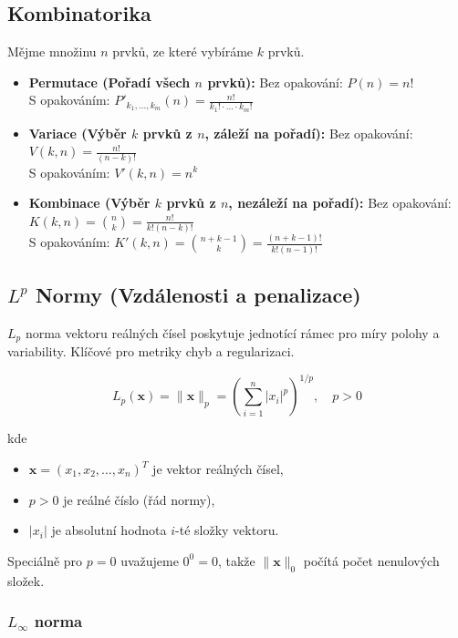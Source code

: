 \documentclass[a4paper, 11pt]{article}
\begin{document}
\subsection{Kombinatorika}
Mějme množinu $n$ prvků, ze které vybíráme $k$ prvků.
\begin{itemize}[noitemsep]
	\item \textbf{Permutace (Pořadí všech $n$ prvků):}
	      Bez opakování: $P(n) = n!$ \\
	      S opakováním: $P'_{k_1, \dots, k_m}(n) = \frac{n!}{k_1! \cdot \dots \cdot k_m!}$
	\item \textbf{Variace (Výběr $k$ prvků z $n$, záleží na pořadí):}
	      Bez opakování: $V(k, n) = \frac{n!}{(n-k)!}$ \\
	      S opakováním: $V'(k, n) = n^k$
	\item \textbf{Kombinace (Výběr $k$ prvků z $n$, nezáleží na pořadí):}
	      Bez opakování: $K(k, n) = \binom{n}{k} = \frac{n!}{k!(n-k)!}$ \\
	      S opakováním: $K'(k, n) = \binom{n+k-1}{k} = \frac{(n+k-1)!}{k!(n-1)!}$
\end{itemize}

\subsection{$L^p$ Normy (Vzdálenosti a penalizace)}

$L_p$ norma vektoru reálných čísel poskytuje jednotící rámec pro míry polohy
a variability. Klíčové pro metriky chyb a regularizaci.

\begin{equation*}
	L_p(\mathbf{x}) = \|\mathbf{x}\|_p = \left(\sum_{i=1}^{n} |x_i|^p\right)^{1/p}, \quad p > 0
\end{equation*}

kde

\begin{itemize}[noitemsep]
	\item $\mathbf{x} = (x_1, x_2, \ldots, x_n)^T$ je vektor reálných čísel,
	\item $p > 0$ je reálné číslo (řád normy),
	\item $|x_i|$ je absolutní hodnota $i$-té složky vektoru.
\end{itemize}

Speciálně pro $p = 0$ uvažujeme $0^0 = 0$, takže $\|\mathbf{x}\|_0$ počítá počet nenulových složek.

\subsubsection{$L_\infty$ norma}
\end{document}
